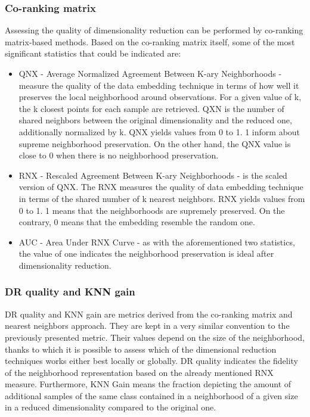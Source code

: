 \documentclass[12pt]{article}
\begin{document}
\subsubsection{Co-ranking matrix}
Assessing the quality of dimensionality reduction can be performed by co-ranking matrix-based methods. Based on the co-ranking matrix itself, some of the most significant statistics that could be indicated are:
\begin{itemize}
    \item QNX - Average Normalized Agreement Between K-ary Neighborhoods \cite{Lee:2009} - measure the quality of the data embedding technique in terms of how well it preserves the local neighborhood around observations. For a given value of k, the k closest points for each sample are retrieved. QXN is the number of shared neighbors between the original dimensionality and the reduced one, additionally normalized by k. QNX yields values from 0 to 1. 1 inform about supreme neighborhood preservation. On the other hand, the QNX value is close to 0 when there is no neighborhood preservation.
    \item RNX - Rescaled Agreement Between K-ary Neighborhoods \cite{Lee:2013} - is the scaled version of QNX. The RNX measures the quality of data embedding technique in terms of the shared number of k nearest neighbors. RNX yields values from 0 to 1. 1 means that the neighborhoods are supremely preserved. On the contrary, 0 means that the embedding resemble the random one.
    \item AUC - Area Under RNX Curve \cite{Lee:2015} - as with the aforementioned two statistics, the value of one indicates the neighborhood preservation is ideal after dimensionality reduction.
\end{itemize}

\subsubsection{DR quality and KNN gain}
DR quality and KNN gain are metrics derived from the co-ranking matrix and nearest neighbors approach. They are kept in a very similar convention to the previously presented metric. Their values depend on the size of the neighborhood, thanks to which it is possible to assess which of the dimensional reduction techniques works either best locally or globally. DR quality indicates the fidelity of the neighborhood representation based on the already mentioned RNX measure. Furthermore, KNN Gain means the fraction depicting the amount of additional samples of the same class contained in a neighborhood of a given size in a reduced dimensionality compared to the original one.
\end{document}
